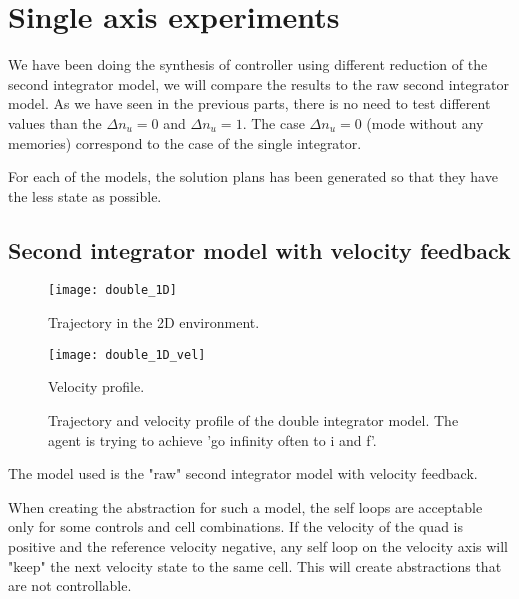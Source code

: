 \section{Single axis experiments}
We have been doing the synthesis of controller using different reduction of the second integrator model, we will compare the results to the raw second integrator model.
As we have seen in the previous parts, there is no need to test different values than the $\Delta n_u = 0$ and $\Delta n_u = 1$.
The case $\Delta n_u = 0$ (mode without any memories) correspond to the case of the single integrator.


For each of the models, the solution plans has been generated so that they have the less state as possible.


\subsection{Second integrator model with velocity feedback}
\begin{figure}[!ht]
	\begin{minipage}[b]{0.5\textwidth}
  		\centering
  		\texttt{[image: double\_1D]}
	  	\caption{Trajectory in the 2D environment.}
	  	\label{double_1D}
  \end{minipage}
	\begin{minipage}[b]{0.5\textwidth}
  		\centering
  		\texttt{[image: double\_1D\_vel]}
	  	\caption{Velocity profile.}
	  	\label{double_1D_vel}
  \end{minipage}
  \caption{Trajectory and velocity profile of the double integrator model. The agent is trying to achieve 'go infinity often to i and f'.}
\end{figure}

The model used is the "raw" second integrator model with velocity feedback.

When creating the abstraction for such a model, the self loops are acceptable only for some controls and cell combinations. 
If the velocity of the quad is positive and the reference velocity negative, any self loop on the velocity axis will "keep" the next velocity state to the same cell.
This will create abstractions that are not controllable.

